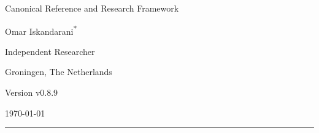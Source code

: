\documentclass[11pt]{article}
\theoremstyle{definition}
\theoremstyle{plain}
\theoremstyle{remark}
\begin{document}
    
    \thispagestyle{empty}

    \begin{center}
        \vspace*{0.06\textheight}

        {\LARGE\bfseries \papertitle\par}
        \vspace{0.45cm}

        {\large Canonical Reference and Research Framework\par}
        \vspace{1.0cm}

        {\Large Omar Iskandarani\textsuperscript{*}\par}
        \vspace{0.35cm}

        {\normalsize Independent Researcher\par}
        {\normalsize Groningen, The Netherlands\par}
        \vspace{0.6cm}

        {\normalsize Version v0.8.9\par}
        {\normalsize \today\par}
        \vspace{0.9cm}

        \rule{0.82\textwidth}{0.5pt}
        \vspace{0.7cm}
    \end{center}

    \begin{abstract}
        \noindent
        This document presents Swirl-String Theory (SST) as a structured canonical synthesis rather than as a claim that every phenomenological sector has already been derived to theorem level. The text consolidates the primitive constant chain linking the effective fluid density, characteristic swirl speed, Compton anchoring, and horn/circulation scale; records delay-induced mode selection as the preferred non-operator route to spectral discreteness; and organizes the atomic bridge, spectroscopic filter, relational-time sector, and topology-based mass program within one explicitly stratified framework. Throughout, orthodox inputs, SST-internal derivations, bridge-level constructions, and conjectural extensions are kept distinct so that the canon remains internally coherent, externally comparable, and open to falsification.
    \end{abstract}
\end{document}
